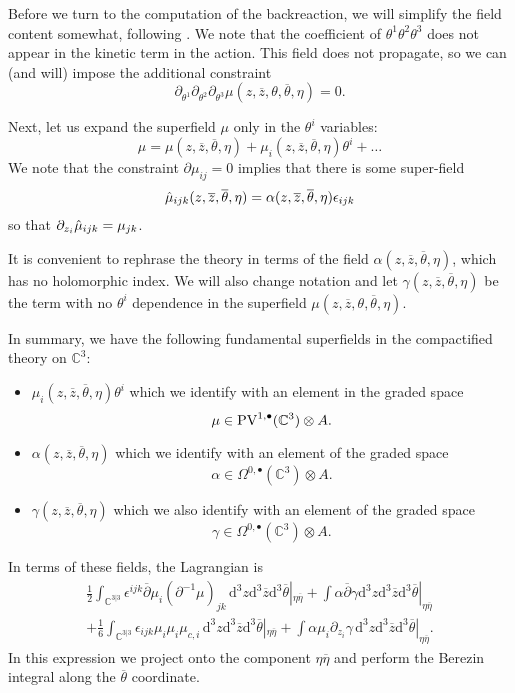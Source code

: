 \documentclass[11pt]{amsart}
\newcommand{\dbar}{\br{\partial}}
\newcommand{\zbar}{\br{z}}
\newcommand{\PV}{\op{PV}}
\newcommand{\eps}{\epsilon}
\newcommand{\what}{\widehat}
\newcommand{\br}{\overline}
\newcommand{\CC}{\mathbb C}
\renewcommand{\d}{\mathrm{d}}
\def\zbar{{\overline{z}}}
\def\PV{{\rm PV}}
\newcommand{\op}{\operatorname}
\def\eps{{\epsilon}}
\def\what{\Hat}
\def\bu{{\bullet}}
\def\beqn{\begin{equation}}
\def\eeqn{\end{equation}}
\theoremstyle{thm}
\numberwithin{equation}{subsection}
\theoremstyle{def}
\theoremstyle{rem}
\begin{document}
Before we turn to the computation of the backreaction, we will simplify the field content somewhat, following \cite{CostelloGaiotto}.  
We note that the coefficient of $\theta^1 \theta^2 \theta^3$ does not appear in the kinetic term in the action.  
This field does not propagate, so we can (and will) impose the additional constraint
\begin{equation}\label{eq:nonprop} 
	\partial_{\theta^1} \partial_{\theta^2} \partial_{\theta^3} \mu (z,\zbar,\theta,\br{\theta},\eta) = 0. 
\end{equation}

Next, let us expand the superfield $\mu$ only in the $\theta^i$ variables:
\begin{equation} 
	\mu = \mu(z,\zbar,\br{\theta},\eta) + \mu_{i}(z,\zbar,\br{\theta},\eta) \theta^i + \dots 
\end{equation}
We note that the constraint $\partial \mu_{ij} = 0$ implies that there is some super-field
\begin{equation} 
	\what{\mu}_{ijk}(z,\zbar,\br{\theta},\eta) = 	\alpha(z,\zbar,\br{\theta},\eta) \eps_{ijk}   
\end{equation}
so that $\partial_{z_i} \what{\mu}_{ijk} = \mu_{jk}$.

It is convenient to rephrase the theory in terms of the field $\alpha(z,\zbar,\br{\theta},\eta)$, which has no holomorphic index. 
We will also change notation and let $\gamma(z,\zbar,\br{\theta},\eta)$ be the term with no $\theta^i$ dependence in the superfield $\mu(z,\zbar,\theta,\br{\theta},\eta)$.  

In summary, we have the following fundamental superfields in the compactified theory on $\CC^3$:
\begin{itemize}
\item $\mu_i (z,\zbar,\br{\theta}, \eta) \theta^i$ which we identify with an element in the graded space
\beqn
\mu \in \PV^{1,\bu}(\CC^3) \otimes A .
\eeqn
\item $\alpha (z,\zbar,\br \theta, \eta)$ which we identify with an element of the graded space
\beqn
\alpha \in \Omega^{0,\bu}(\CC^3) \otimes A .
\eeqn
\item $\gamma(z,\zbar,\br \theta, \eta)$ which we also identify with an element of the graded space
\beqn
\gamma \in \Omega^{0,\bu}(\CC^3) \otimes A .
\eeqn
\end{itemize}
In terms of these fields, the Lagrangian is
\begin{multline} 
	\tfrac{1}{2}\int_{\CC^{3|3}}   \eps^{ijk} \dbar \mu_{i} (\partial^{-1}  \mu)_{jk} \, \d^3 z \d^3 \zbar \d^3 \br{\theta} |_{\eta \br \eta}   + \int  \alpha \dbar \gamma \d^3 z \d^3 \zbar \d^3 \br{\theta} |_{\eta \br{\eta}} 
	\\
	+ \tfrac{1}{6} \int_{\CC^{3|3}}  \eps_{ijk} \mu_{i}\mu_{i} \mu_{c,i} \, \d^3 z \d^3 \br{z} \d^3 \br{\theta} |_{\eta \br{\eta}} + \int  \alpha \mu_i \partial_{z_i}  \gamma \, \d^3 z \d^3 \zbar \d^3 \br{\theta} |_{\eta \br{\eta}} .
\end{multline} 
In this expression we project onto the component $\eta \br \eta$ and perform the Berezin integral along the $\br \theta$ coordinate.
\end{document}
